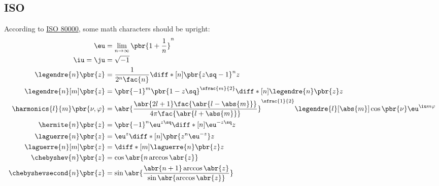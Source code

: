 \subsection{ISO}

According to \href{https://webusers.imj-prg.fr/~jean-yves.ducloux/Typographie/ISO80000-2.pdf}{ISO 80000}, some math characters should be upright:
\begin{align*}
    \eu                                &= \lim_{n\to\infty}\pbr{1 + \frac{1}{n}}^n                                                                                                           \\
    \iu = \ju                          &= \sqrt{-1}                                                                                                                                          \\
    \legendre{n}\pbr{z}                &= \frac{1}{2^n\fac{n}}\diff*[n]{\pbr{z\sq - 1}^n}{z}                                                                                                 \\
    \legendre{n}[m]\pbr{z}             &= \pbr{-1}^m \pbr{1 - z\sq}^{\sfrac{m}{2}} \diff*[n]{\legendre{n}\pbr{z}}{z}                                                                         \\
    \harmonics{l}{m}\pbr{\nu, \varphi} &= \abr{\frac{\abr{2l + 1}\fac{\abr{l - \abs{m}}}}{4\pi\fac{\abr{l + \abs{m}}}}}^{\sfrac{1}{2}} \legendre{l}[\abs{m}] \cos\pbr{\nu}\eu^{\iu m\varphi} \\
    \hermite{n}\pbr{z}                 &= \pbr{-1}^n \eu^{z\sq} \diff*[n]{\eu^{-z\sq}}{z}                                                                                                    \\
    \laguerre{n}\pbr{z}                &= \eu^z \diff*[n]{\pbr{z^n \eu^{-z}}}{z}                                                                                                             \\
    \laguerre{n}[m]\pbr{z}             &= \diff*[m]{\laguerre{n}\pbr{z}}{z}                                                                                                                  \\
    \chebyshev{n}\pbr{z}               &= \cos\abr{n\arccos\abr{z}}                                                                                                                          \\
    \chebyshevsecond{n}\pbr{z}         &= \sin\abr{\frac{\abr{n + 1}\arccos\abr{z}}{\sin\abr{\arccos\abr{z}}}}                                                                               \\

\end{align*}

